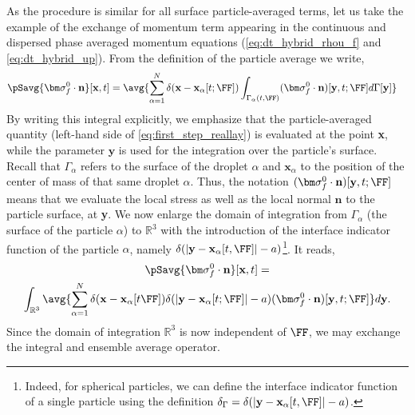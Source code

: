 As the procedure is similar for all surface particle-averaged terms, let us take the example of the exchange of momentum term appearing in the continuous and dispersed phase averaged momentum equations (\ref{eq:dt_hybrid_rhou_f} and \ref{eq:dt_hybrid_up}). 
From the definition of the particle average we write,
\begin{align}
    \pSavg{\bm\sigma_f^0\cdot\textbf{n}}[\textbf{x},t]
    &= \avg{ \sum_{\alpha=1}^N \delta(\textbf{x}-\textbf{x}_\alpha[t; \FF])
    \int_{\Gamma_\alpha(t,\FF)}
    (\bm\sigma_f^0\cdot\textbf{n})[\textbf{y},t;\FF]
    d\Gamma[\textbf{y}] }
    \label{eq:first_step_reallay}
\end{align}
By writing this integral explicitly, we emphasize that the particle-averaged quantity (left-hand side of \ref{eq:first_step_reallay}) is evaluated at the point \textbf{x}, while the parameter $\textbf{y}$ is used for the integration over the particle's surface.
Recall that $\Gamma_\alpha$ refers to the surface of the droplet $\alpha$ and $\textbf{x}_\alpha$ to the position of the center of mass of that same droplet $\alpha$. 
Thus, the notation $(\bm\sigma_f^0\cdot\textbf{n})[\textbf{y},t;\FF]$ means that we evaluate the local stress as well as the local normal $\textbf{n}$ to the particle surface, at \textbf{y}. 
We now enlarge the domain of integration from $\Gamma_\alpha$ (the surface of the particle $\alpha$) to $\mathbb{R}^3$ with the introduction of the interface indicator function of the particle $\alpha$, namely $\delta(|\textbf{y} - \textbf{x}_\alpha[t,\FF]| - a)$\footnote{Indeed, for spherical particles, we can define the interface indicator function of a single particle using the definition $\delta_\Gamma = \delta(|\textbf{y} - \textbf{x}_\alpha[t,\FF]| - a)$.}. 
It reads,
\begin{multline}
    \pSavg{\bm\sigma_f^0\cdot\textbf{n}}[\textbf{x},t]
    = \\
    \int_{\mathbb{R}^3}
    \avg{
     \sum_{\alpha=1}^N 
     \delta(\textbf{x}-\textbf{x}_\alpha[t \FF])
    \delta(|\textbf{y} - \textbf{x}_{\alpha}[t;\FF]|-a)
    (\bm\sigma_f^0\cdot\textbf{n})[\textbf{y},t;\FF]
    }
    d\textbf{y}. 
    \label{eq:first_step_drag}
\end{multline} 
Since the domain of integration $\mathbb{R}^3$ is now independent of $\FF$, we may exchange the integral and ensemble average operator. 

